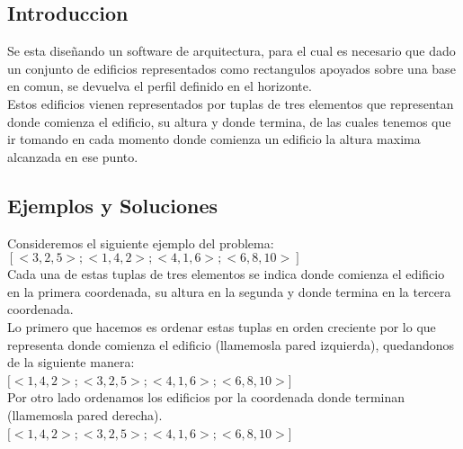 \subsection{Introduccion} 
Se esta diseñando un software de arquitectura, para el cual es necesario que dado un conjunto de edificios representados como rectangulos apoyados sobre una base en comun, se devuelva el perfil definido en el horizonte.\\
Estos edificios vienen representados por tuplas de tres elementos que representan donde comienza el edificio, su altura y donde termina, de las cuales tenemos que ir tomando en cada momento donde comienza un edificio la altura maxima alcanzada en ese punto.

 \subsection{Ejemplos y Soluciones}
 Consideremos el siguiente ejemplo del problema:\\
 $ [<3,2,5>;<1,4,2>;<4,1,6>;<6,8,10>]$ \\
  Cada una de estas tuplas de tres elementos se indica donde comienza el edificio en la primera coordenada, su altura en la segunda y donde termina en la tercera coordenada.\\
  
  Lo primero que hacemos es ordenar estas tuplas en orden creciente por lo que representa donde comienza el edificio (llamemosla pared izquierda), quedandonos de la siguiente manera:\\ 
$[<1,4,2>;<3,2,5>;<4,1,6>;<6,8,10>$] \\

Por otro lado ordenamos los edificios por la coordenada donde terminan (llamemosla pared derecha).\\
$[<1,4,2>;<3,2,5>;<4,1,6>;<6,8,10>$] \\

